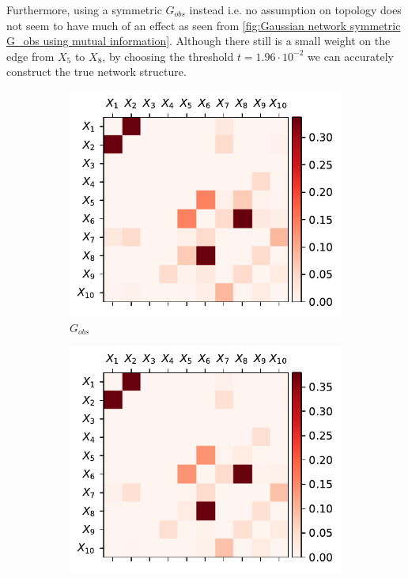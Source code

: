 \documentclass[../Thesis.tex]{subfiles}
\begin{document}
Furthermore, using a symmetric $G_{obs}$ instead i.e. no assumption on topology does not seem to have much of an effect as seen from \autoref{fig:Gaussian network symmetric G_obs using mutual information}. Although there still is a small weight on the edge from $X_5$ to $X_8$, by choosing the threshold $t = 1.96 \cdot 10^{-2}$ we can accurately construct the true network structure.
\begin{figure}[H]
    \centering
    \begin{subfigure}[t]{0.49\textwidth}
        \centering
        \includegraphics[width=.95\linewidth]{figures/Gaussian Network Theoretical/symmetric G obs - MI.pdf}
        \caption{$G_{obs}$}
    \end{subfigure}
    \hfill
    \begin{subfigure}[t]{0.49\textwidth}
        \centering
        \includegraphics[width=.95\linewidth]{figures/Gaussian Network Theoretical/G dir from symmetric G obs - MI.pdf}

\end{subfigure}
\end{figure}
\end{document}
